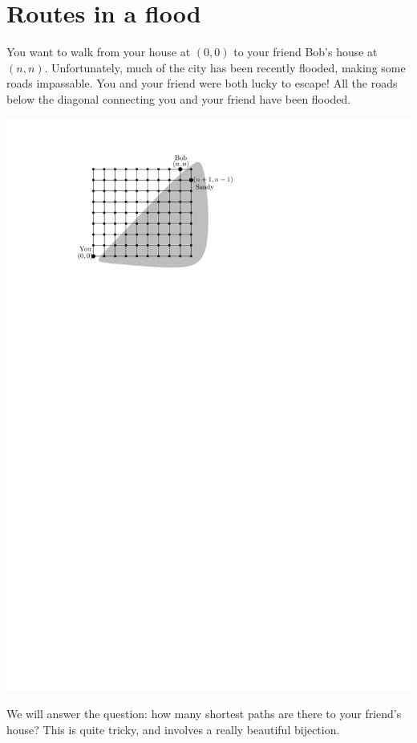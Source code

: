 \documentclass[12pt]{article}
\begin{document}

\section*{Routes in a flood}

You want to walk from your house at $(0,0)$ to your friend Bob's house at $(n, n)$. Unfortunately, much of the city has been recently flooded, making some roads impassable. You and your friend were both lucky to escape! All the roads below the diagonal connecting you and your friend have been flooded.

\begin{center}
    \includegraphics[page=1]{flooded}
\end{center}

We will answer the question: how many shortest paths are there to your friend's house? This is quite tricky, and involves a really beautiful bijection.
\end{document}
